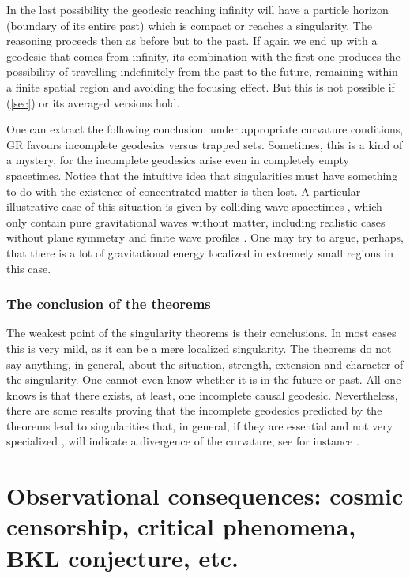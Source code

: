 \documentclass[12pt]{iopart}
\begin{document}
In the last possibility the geodesic reaching infinity will have a particle horizon (boundary of its entire past) 
which is compact or reaches a singularity. The reasoning proceeds then as before
but to the past.  If again we end up  with a geodesic that comes from infinity, its combination with the first one produces the
possibility of travelling indefinitely from the past to the future, remaining
within a finite spatial region and avoiding the focusing effect. But this is
not possible if (\ref{sec}) or its averaged versions hold.

One can extract the following conclusion: under appropriate curvature conditions, 
GR favours incomplete geodesics versus trapped sets. Sometimes, this is a kind of a mystery,
for the incomplete geodesics arise even in completely empty spacetimes. Notice that
the intuitive idea that singularities must have something to do with the
existence of concentrated matter is then lost. A particular illustrative case of this situation is given by colliding wave spacetimes \cite{Gri,T7}, which only contain pure gravitational waves without matter, including realistic cases
without plane symmetry and finite wave profiles \cite{Y2}. 
One may try to argue, perhaps, that there
is a lot of gravitational energy localized in extremely small regions in this case.



\subsubsection{The conclusion of the theorems}\label{subsubsec:conclusion}
 The weakest point of the singularity theorems is their conclusions. In most 
cases this is very mild, as it can be a mere localized singularity. The theorems do not say anything, in general, about the situation, strength, extension and 
character of the singularity. One cannot even know whether it is in the 
future or past. All one knows is that there exists, at least, one incomplete causal geodesic.
Nevertheless, there are some results proving that the incomplete geodesics predicted by the theorems lead to singularities that, in general, if they are essential and not very specialized
\cite{Cla1,Cla2,Cla3}, will indicate a divergence of the curvature, see for instance
\cite{Cla1,Cla2,Cla3,Cla4,CS,Tho,TCE}.

\section{Observational consequences: cosmic censorship, critical phenomena, BKL conjecture, etc.}\label{sec:numerics}
\end{document}
